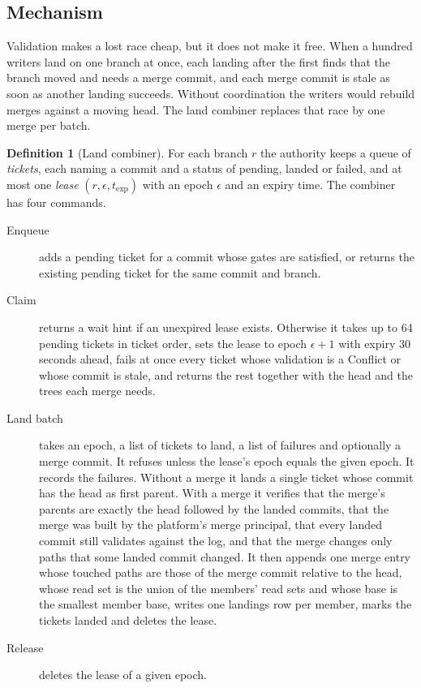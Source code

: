 \documentclass[11pt,letterpaper]{article}
\theoremstyle{definition}
\newtheorem{definition}[theorem]{Definition}
\theoremstyle{remark}
\begin{document}
\subsection{Mechanism}

Validation makes a lost race cheap, but it does not make it free. When a hundred writers land on one branch at once, each landing after the first finds that the branch moved and needs a merge commit, and each merge commit is stale as soon as another landing succeeds. Without coordination the writers would rebuild merges against a moving head. The land combiner replaces that race by one merge per batch.

\begin{definition}[Land combiner]
\label{def:tlsc:combiner}
For each branch $r$ the authority keeps a queue of \emph{tickets}, each naming a commit and a status of pending, landed or failed, and at most one \emph{lease} $(r,\epsilon,t_{\mathrm{exp}})$ with an epoch $\epsilon$ and an expiry time. The combiner has four commands.
\begin{description}
\item[Enqueue] adds a pending ticket for a commit whose gates are satisfied, or returns the existing pending ticket for the same commit and branch.
\item[Claim] returns a wait hint if an unexpired lease exists. Otherwise it takes up to 64 pending tickets in ticket order, sets the lease to epoch $\epsilon+1$ with expiry 30 seconds ahead, fails at once every ticket whose validation is a Conflict or whose commit is stale, and returns the rest together with the head and the trees each merge needs. %
\item[Land batch] takes an epoch, a list of tickets to land, a list of failures and optionally a merge commit. It refuses unless the lease's epoch equals the given epoch. It records the failures. Without a merge it lands a single ticket whose commit has the head as first parent. With a merge it verifies that the merge's parents are exactly the head followed by the landed commits, that the merge was built by the platform's merge principal, that every landed commit still validates against the log, and that the merge changes only paths that some landed commit changed. It then appends one merge entry whose touched paths are those of the merge commit relative to the head, whose read set is the union of the members' read sets and whose base is the smallest member base, writes one landings row per member, marks the tickets landed and deletes the lease.
\item[Release] deletes the lease of a given epoch.
\end{description}
\end{definition}
\end{document}
